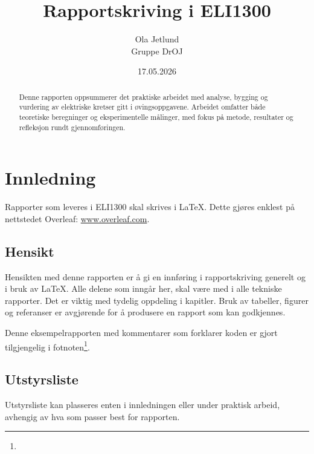\documentclass[11pt,a4paper,twocolumn]{article}
\title{Rapportskriving i ELI1300}
\author{Ola Jetlund\\Gruppe DrOJ}
\date{17.05.2026}
\begin{document}
\maketitle %

\begin{abstract}
    Denne rapporten oppsummerer det praktiske arbeidet med analyse, bygging og vurdering av elektriske kretser gitt i øvingsoppgavene. Arbeidet omfatter både teoretiske beregninger og eksperimentelle målinger, med fokus på metode, resultater og refleksjon rundt gjennomføringen.    
\end{abstract}


\section{Innledning}
Rapporter som leveres i ELI1300 skal skrives i \LaTeX. Dette gjøres enklest på nettstedet
Overleaf: \url{www.overleaf.com}.
\subsection{Hensikt}
Hensikten med denne rapporten er å gi en innføring i rapportskriving generelt og i bruk av \LaTeX. Alle delene som inngår her, skal være med i alle tekniske rapporter. Det er viktig med tydelig oppdeling i kapitler. Bruk av tabeller, figurer og referanser er avgjørende for å produsere en rapport som kan godkjennes.

Denne eksempelrapporten med kommentarer som forklarer koden er gjort tilgjengelig i fotnoten\footnote{\myoverleafurl}.


\subsection{Utstyrsliste}

Utstyrsliste kan plasseres enten i innledningen eller under praktisk arbeid, avhengig av hva som passer best for rapporten.
\end{document}
